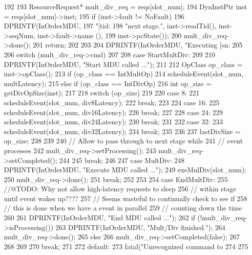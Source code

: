 \begin{DoxyCode}
192 {
193     ResourceRequest* mult_div_req = reqs[slot_num];
194     DynInstPtr inst = reqs[slot_num]->inst;
195     if (inst->fault != NoFault) {
196         DPRINTF(InOrderMDU,
197                 "[tid:%
198                 "next stage.\n", inst->readTid(), inst->seqNum, inst->fault->name
      (),
199                 inst->pcState());
200         mult_div_req->done();
201         return;
202     }
203 
204     DPRINTF(InOrderMDU, "Executing [sn:%
205 
206     switch (mult_div_req->cmd)
207     {
208       case StartMultDiv:
209         {
210             DPRINTF(InOrderMDU, "Start MDU called ...\n");
211 
212             OpClass op_class = inst->opClass();
213             if (op_class == IntMultOp) {
214                 scheduleEvent(slot_num, multLatency);
215             } else if (op_class == IntDivOp) {
216                 int op_size = getDivOpSize(inst);
217 
218                 switch (op_size)
219                 {
220                   case 8:
221                     scheduleEvent(slot_num, div8Latency);
222                     break;
223 
224                   case 16:
225                     scheduleEvent(slot_num, div16Latency);
226                     break;
227 
228                   case 24:
229                     scheduleEvent(slot_num, div24Latency);
230                     break;
231 
232                   case 32:
233                     scheduleEvent(slot_num, div32Latency);
234                     break;
235                 }
236 
237                 lastDivSize = op_size;
238             }
239 
240             // Allow to pass through to next stage while
241             // event processes
242             mult_div_req->setProcessing();
243             mult_div_req->setCompleted();
244         }
245         break;
246         
247       case MultDiv:
248         DPRINTF(InOrderMDU, "Execute MDU called ...\n");        
249         exeMulDiv(slot_num);        
250         mult_div_req->done();
251         break;
252 
253 
254       case EndMultDiv:
255         //@TODO: Why not allow high-latency requests to sleep
256         //      within stage until event wakes up????
257         //      Seems wasteful to continually check to see if
258         //      this is done when we have a event in parallel
259         //      counting down the time
260         {
261             DPRINTF(InOrderMDU, "End MDU called ...\n");    
262             if (!mult_div_req->isProcessing()) {
263                 DPRINTF(InOrderMDU, "Mult/Div finished.\n");                    
264                 mult_div_req->done();            
265             } else {                
266                 mult_div_req->setCompleted(false);
267             }
268             
269         }
270         break;
271 
272       default:
273         fatal("Unrecognized command to %
274     }
275 }
\end{DoxyCode}
